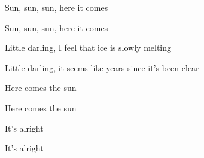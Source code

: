 \begin{song}
Sun, sun, sun, here it comes  \par
{}Sun, sun, sun, here it comes \par
{}    \par

\bigskip

 Little darling, I feel that ice is slowly melting \par
{} Little darling, it seems like years since it's been clear \par

\bigskip

\Chorus

\bigskip

\begin{strumbox}
\large
{}
\end{strumbox}

 Here comes the sun  \par
{} Here comes the sun \par
{} It's alright   \par
{} It's alright   \par

   

\vfill

\end{song}
